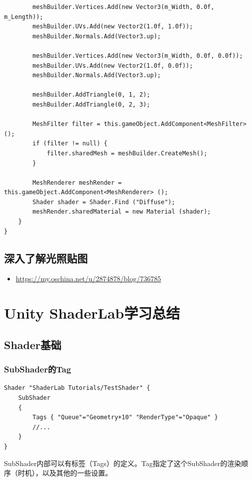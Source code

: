 \documentclass[9pt, b5paper]{article}
\begin{document}
\begin{itemize}
\begin{verbatim}
        meshBuilder.Vertices.Add(new Vector3(m_Width, 0.0f, m_Length));
        meshBuilder.UVs.Add(new Vector2(1.0f, 1.0f));
        meshBuilder.Normals.Add(Vector3.up);
		
        meshBuilder.Vertices.Add(new Vector3(m_Width, 0.0f, 0.0f));
        meshBuilder.UVs.Add(new Vector2(1.0f, 0.0f));
        meshBuilder.Normals.Add(Vector3.up);
		
        meshBuilder.AddTriangle(0, 1, 2);
        meshBuilder.AddTriangle(0, 2, 3);
		
        MeshFilter filter = this.gameObject.AddComponent<MeshFilter> ();
        if (filter != null) {
            filter.sharedMesh = meshBuilder.CreateMesh();
        }
		
        MeshRenderer meshRender = this.gameObject.AddComponent<MeshRenderer> ();
        Shader shader = Shader.Find ("Diffuse");
        meshRender.sharedMaterial = new Material (shader);
    }
}
\end{verbatim}
\end{itemize}

\subsection{深入了解光照贴图}
\label{sec:orgbbf8cad}
\begin{itemize}
\item \url{https://my.oschina.net/u/2874878/blog/736785}
\end{itemize}

\section{Unity ShaderLab学习总结}
\label{sec:org37ec4d6}
\subsection{Shader基础}
\label{sec:org3dd8fbd}
\subsubsection{SubShader的Tag}
\label{sec:org5d44b7a}
\begin{verbatim}
Shader "ShaderLab Tutorials/TestShader" {
    SubShader
    {
        Tags { "Queue"="Geometry+10" "RenderType"="Opaque" }
        //...
    }
}
\end{verbatim}

SubShader内部可以有标签（Tags）的定义。Tag指定了这个SubShader的渲染顺序（时机），以及其他的一些设置。
\end{document}
